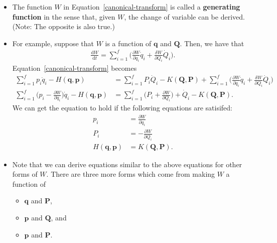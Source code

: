 \documentclass[10pt]{article}
\newcommand{\dee}{\mathrm{d}}
\newcommand{\ve}[1]{\mathbf{#1}}
\begin{document}
  \begin{itemize}
    \item The function $W$ in Equation~\ref{canonical-transform} is called a {\bf generating function} in the sense that, given $W$, the change of variable can be derived. (Note: The opposite is also true.)

    \item For example, suppose that $W$ is a function of $\ve{q}$ and $\ve{Q}$. Then, we have that
    \begin{align*}
      \frac{\dee W}{\dee t} = \sum_{i=1}^f \bigg( \frac{\partial W}{\partial q_i} \dot{q}_i + \frac{\delta W}{\partial Q_i}\dot{Q}_i \bigg).
    \end{align*}
    Equation~\ref{canonical-transform} becomes
    \begin{align*}
      \sum_{i=1}^f p_i \dot{q}_i - H(\ve{q},\ve{p}) 
      &= \sum_{i=1}^f P_i \dot{Q}_i - K(\ve{Q}, \ve{P}) + \sum_{i=1}^f \bigg( \frac{\partial W}{\partial q_i} \dot{q}_i + \frac{\delta W}{\partial Q_i}\dot{Q}_i \bigg) \\
       \sum_{i=1}^f \bigg( p_i - \frac{\partial W}{\partial q_i} \bigg)\dot{q}_i - H(\ve{q},\ve{p}) 
       &= \sum_{i=1}^f \bigg( P_i + \frac{\partial W}{\partial Q_i} \bigg) + \dot{Q}_i - K(\ve{Q}, \ve{P}).
    \end{align*}
    We can get the equation to hold if the following equations are satisifed:
    \begin{align*}
      p_i &= \frac{\partial W}{\partial q_i} \\
      P_i &= -\frac{\partial W}{\partial Q_i} \\
      H(\ve{q},\ve{p}) &= K(\ve{Q}, \ve{P}).
    \end{align*}

    \item Note that we can derive equations similar to the above equations for other forms of $W$. There are three more forms which come from making $W$ a function of 
    \begin{itemize}
      \item $\ve{q}$ and $\ve{P}$,
      \item $\ve{p}$ and $\ve{Q}$, and
      \item $\ve{p}$ and $\ve{P}$.
    \end{itemize}


\end{itemize}
\end{document}

